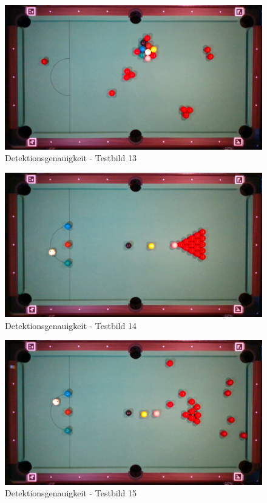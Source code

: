 \begin{figure}[h!]
    \begin{center}
        \includegraphics[width=0.8\linewidth]{../common/07_appendix/resources/00_detection/12_detektion_testbild_13.png}
    \end{center}
    \caption{Detektionsgenauigkeit - Testbild 13}
    \label{fig:detektionsgenauigkeit:testbild:13}
\end{figure}
\begin{figure}[h!]
    \begin{center}
        \includegraphics[width=0.8\linewidth]{../common/07_appendix/resources/00_detection/13_detektion_testbild_14.png}
    \end{center}
    \caption{Detektionsgenauigkeit - Testbild 14}
    \label{fig:detektionsgenauigkeit:testbild:14}
\end{figure}
\begin{figure}[h!]
    \begin{center}
        \includegraphics[width=0.8\linewidth]{../common/07_appendix/resources/00_detection/14_detektion_testbild_15.png}
    \end{center}
    \caption{Detektionsgenauigkeit - Testbild 15}
    \label{fig:detektionsgenauigkeit:testbild:15}
\end{figure}
